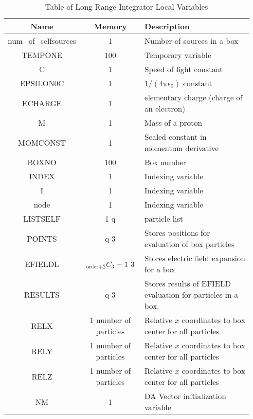\documentclass[oneside,12pt]{book}
\begin{document}
\begin{center}
\begin{table}[ht]
\begin{tabular}{|c|c|p{3.1in}|}
\hline
\textbf{Name} & \textbf{Memory} & \textbf{Description}\\
\hline
num\_of\_selfsources & 1 & Number of sources in a box\\
\hline
TEMPONE & 100 & Temporary variable\\
\hline
C & 1 & Speed of light constant\\
\hline
EPSILON0C & 1 & $1 \slash (4 \pi \epsilon_0)$ constant\\
\hline
ECHARGE & 1 & elementary charge (charge of an electron)\\
\hline
M & 1 & Mass of a proton\\
\hline
MOMCONST & 1 & Scaled constant in momentum derivative\\
\hline
BOXNO & 100 & Box number \\
\hline
INDEX & 1 & Indexing variable\\
\hline
I & 1 & Indexing variable\\
\hline
node & 1 & Indexing variable\\
\hline
LISTSELF & 1 q & particle list\\
\hline
POINTS & q 3 & Stores positions for evaluation of box particles\\
\hline
EFIELDL & $_\text{order+2}C_3-1$ 3 & Stores electric field expansion for a box\\
\hline
RESULTS & q 3 & Stores results of EFIELD evaluation for particles in a box.\\
\hline
RELX & 1 number of particles & Relative $x$ coordinates to box center for all particles\\
\hline
RELY & 1 number of particles & Relative $x$ coordinates to box center for all particles\\
\hline
RELZ & 1 number of particles & Relative $x$ coordinates to box center for all particles\\
\hline
NM & 1 & DA Vector initialization variable\\
\hline
\end{tabular}
\caption{Table of Long Range Integrator Local Variables}
\end{table}
\end{center}
\end{document}

